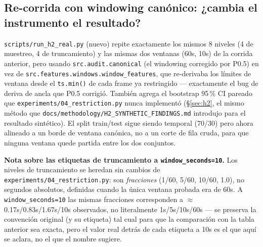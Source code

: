 \documentclass[11pt]{article}
\newcommand{\code}[1]{\texttt{\small #1}}
\begin{document}
\subsection{Re-corrida con windowing canónico: ¿cambia el instrumento el resultado?}
\label{sec:h2-canonical}

\code{scripts/run\_h2\_real.py} (nuevo) repite exactamente los mismos 8 niveles (4 de muestreo, 4
de truncamiento) y las mismas dos ventanas (60s, 10s) de la corrida anterior, pero usando
\code{src.audit.canonical} (el windowing corregido por P0.5) en vez de
\code{src.features.windows.window\_features}, que re-derivaba los límites de ventana desde el
\code{ts.min()} de cada frame ya restringido --- exactamente el bug de deriva de ancla que P0.5
corrigió. También agrega el bootstrap 95\,\% CI pareado que \code{experiments/04\_restriction.py}
nunca implementó (\S\ref{sec:h2}, el mismo método que
\code{docs/methodology/H2\_SYNTHETIC\_FINDINGS.md} introdujo para el resultado sintético). El split
train/test sigue siendo temporal (70/30) pero ahora alineado a un borde de ventana canónica, no a
un corte de fila cruda, para que ninguna ventana quede partida entre los dos conjuntos.

\textbf{Nota sobre las etiquetas de truncamiento a \code{window\_seconds=10}.} Los niveles de
truncamiento se heredan sin cambios de \code{experiments/04\_restriction.py}: son
\emph{fracciones} (1/60, 5/60, 10/60, 1.0), no segundos absolutos, definidas cuando la única
ventana probada era de 60s. A \code{window\_seconds=10} las mismas fracciones corresponden a
$\approx$0.17s/0.83s/1.67s/10s observados, no literalmente 1s/5s/10s/60s --- se preserva la
convención original (y su etiqueta) tal cual para que la comparación con la tabla anterior sea
exacta, pero el valor real detrás de cada etiqueta a 10s es el que aquí se aclara, no el que el
nombre sugiere.
\end{document}
